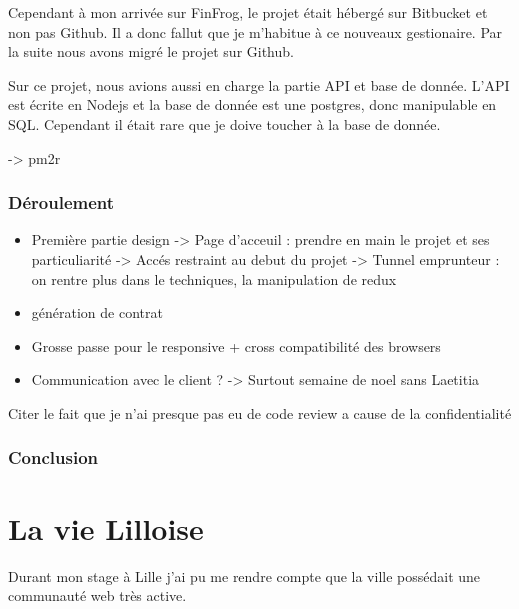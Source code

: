 \documentclass[12pt,a4paper]{article}
\begin{document}
  \bigskip

  Cependant à mon arrivée sur FinFrog, le projet était hébergé sur
  Bitbucket et non pas Github. Il a donc fallut que je m'habitue à ce
  nouveaux gestionaire. Par la suite nous avons migré le projet sur
  Github.

  \bigskip

  Sur ce projet, nous avions aussi en charge la partie API et base de
  donnée. L'API est écrite en Nodejs et la base de donnée est une
  postgres, donc manipulable en SQL. Cependant il était rare que je doive
  toucher à la base de donnée.

  \bigskip

  -\textgreater{} pm2r

  \subsubsection{Déroulement}\label{duxe9roulement-1}

  \begin{itemize}
  \item
    Première partie design -\textgreater{} Page d'acceuil : prendre en
    main le projet et ses particuliarité -\textgreater{} Accés restraint
    au debut du projet -\textgreater{} Tunnel emprunteur : on rentre plus
    dans le techniques, la manipulation de redux
  \item
    génération de contrat
  \item
    Grosse passe pour le responsive + cross compatibilité des browsers
  \item
    Communication avec le client ? -\textgreater{} Surtout semaine de noel
    sans Laetitia
  \end{itemize}

  Citer le fait que je n'ai presque pas eu de code review a cause de la
  confidentialité

  \subsubsection{Conclusion}\label{conclusion-1}

  \newpage

  \section{La vie Lilloise}\label{la-vie-lilloise}

  Durant mon stage à Lille j'ai pu me rendre compte que la ville possédait
  une communauté web très active.
\end{document}

